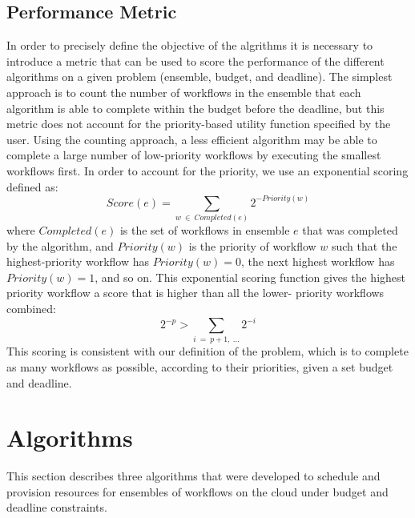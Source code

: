 \documentclass[preprint,5p]{elsarticle}
\begin{document}
\subsection{Performance Metric}
\label{sec:perf_metric}
In order to precisely define the objective of the algrithms it is necessary to
introduce a metric that can be used to score the performance of the different
algorithms on a given problem (ensemble, budget, and deadline). The simplest
approach is to count the number of workflows in the ensemble that each algorithm
is able to complete within the budget before the deadline, but this metric does
not account for the priority-based utility function specified by the user. Using
the counting approach, a less efficient algorithm may be able to complete a
large number of low-priority workflows by executing the smallest workflows
first. In order to account for the priority, we use an exponential
scoring defined as:
$$ Score(e) = \sum_{w~\in~Completed(e)}{2^{-Priority(w)}} $$
where $Completed(e)$ is the set of workflows in ensemble $e$ that was completed
by the algorithm, and $Priority(w)$ is the priority of workflow $w$ such that
the highest-priority workflow has $Priority(w)=0$, the next highest workflow has
$Priority(w)=1$, and so on. This exponential scoring function gives the highest
priority workflow a score that is higher than all the lower- priority workflows
combined:
$$ 2^{-p} > \sum_{i~=~p+1,~\ldots}2^{-i} $$
This scoring is consistent with our definition of the problem, which is to
complete as many workflows as possible, according to their priorities, given a
set budget and deadline.


\section{Algorithms}
\label{sec:algorithms}

This section describes three algorithms that were developed to schedule and
provision resources for ensembles of workflows on the cloud under budget and
deadline constraints.
\end{document}
